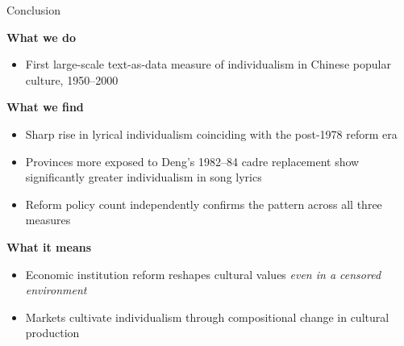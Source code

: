 \documentclass[aspectratio=169]{beamer}
\begin{document}
\begin{frame}{Conclusion}

\textbf{What we do}
\begin{itemize}
  \item First large-scale text-as-data measure of individualism in Chinese popular culture, 1950--2000
\end{itemize}

\vspace{0.5em}
\textbf{What we find}
\begin{itemize}
  \item Sharp rise in lyrical individualism coinciding with the post-1978 reform era
  \item Provinces more exposed to Deng's 1982--84 cadre replacement show significantly greater individualism in song lyrics
  \item Reform policy count independently confirms the pattern across all three measures
\end{itemize}

\vspace{0.5em}
\textbf{What it means}
\begin{itemize}
  \item Economic institution reform reshapes cultural values \textit{even in a censored environment}
  \item Markets cultivate individualism through compositional change in cultural production
\end{itemize}

\end{frame}

\appendix

\beamerdefaultoverlayspecification{}
\end{document}
